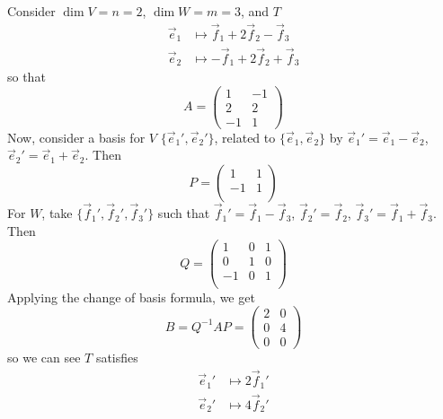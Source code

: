 \documentclass{../template/note}
\begin{document}
    \begin{example}
        Consider \(\dim V = n = 2\), \(\dim W = m = 3\), and \(T\)
        \begin{align*}
            \vec e_1 &\mapsto \vec f_1 + 2 \vec f_2 - \vec f_3 \\
            \vec e_2 &\mapsto -\vec f_1 + 2 \vec f_2 + \vec f_3
        \end{align*}
        so that
        \[
            A = \begin{pmatrix}
             1 & -1 \\
             2 & 2 \\ 
             -1 & 1
            \end{pmatrix}
        \]
        Now, consider a basis for \(V\) \(\{\vec e_1', \vec e_2'\}\), related to \(\{\vec e_1, \vec e_2\}\) by \(\vec e_1' = \vec e_1 - \vec e_2\), \(\vec e_2' = \vec e_1 + \vec e_2\). Then
        \[
            P = \begin{pmatrix}
             1 & 1 \\
             -1 & 1 \\
            \end{pmatrix}
        \]
        For \(W\), take \(\{\vec f_1', \vec f_2', \vec f_3'\}\) such that \(\vec f_1' = \vec f_1 - \vec f_3\), \(\vec f_2' = \vec f_2\), \(\vec f_3' = \vec f_1 + \vec f_3\). Then
        \[
            Q = \begin{pmatrix}
             1 & 0 & 1 \\
             0 & 1 & 0 \\
             -1 & 0 & 1 \\
            \end{pmatrix}
        \]
        Applying the change of basis formula, we get
        \[
            B = Q^{-1}AP = \begin{pmatrix}
             2 & 0 \\
             0 & 4 \\ 
             0 & 0
            \end{pmatrix}
        \]
        so we can see \(T\) satisfies
        \begin{align*}
            \vec e_1' &\mapsto 2 \vec f_1' \\
            \vec e_2' &\mapsto 4 \vec f_2'
        \end{align*}
    \end{example}
    
\end{document}
